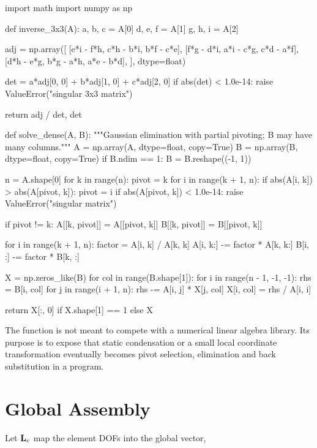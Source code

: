 \begin{python}
import math
import numpy as np


def inverse_3x3(A):
    a, b, c = A[0]
    d, e, f = A[1]
    g, h, i = A[2]

    adj = np.array([
        [e*i - f*h, c*h - b*i, b*f - c*e],
        [f*g - d*i, a*i - c*g, c*d - a*f],
        [d*h - e*g, b*g - a*h, a*e - b*d],
    ], dtype=float)

    det = a*adj[0, 0] + b*adj[1, 0] + c*adj[2, 0]
    if abs(det) < 1.0e-14:
        raise ValueError("singular 3x3 matrix")

    return adj / det, det


def solve_dense(A, B):
    """Gaussian elimination with partial pivoting; B may have many columns."""
    A = np.array(A, dtype=float, copy=True)
    B = np.array(B, dtype=float, copy=True)
    if B.ndim == 1:
        B = B.reshape((-1, 1))

    n = A.shape[0]
    for k in range(n):
        pivot = k
        for i in range(k + 1, n):
            if abs(A[i, k]) > abs(A[pivot, k]):
                pivot = i
        if abs(A[pivot, k]) < 1.0e-14:
            raise ValueError("singular matrix")

        if pivot != k:
            A[[k, pivot]] = A[[pivot, k]]
            B[[k, pivot]] = B[[pivot, k]]

        for i in range(k + 1, n):
            factor = A[i, k] / A[k, k]
            A[i, k:] -= factor * A[k, k:]
            B[i, :] -= factor * B[k, :]

    X = np.zeros_like(B)
    for col in range(B.shape[1]):
        for i in range(n - 1, -1, -1):
            rhs = B[i, col]
            for j in range(i + 1, n):
                rhs -= A[i, j] * X[j, col]
            X[i, col] = rhs / A[i, i]

    return X[:, 0] if X.shape[1] == 1 else X
\end{python}

The function is not meant to compete with a numerical linear algebra library.
Its purpose is to expose that static condensation or a small local coordinate
transformation eventually becomes pivot selection, elimination and back
substitution in a program.

\section{Global Assembly}

Let $\mathbf{L}_e$ map the element DOFs into the global vector,

